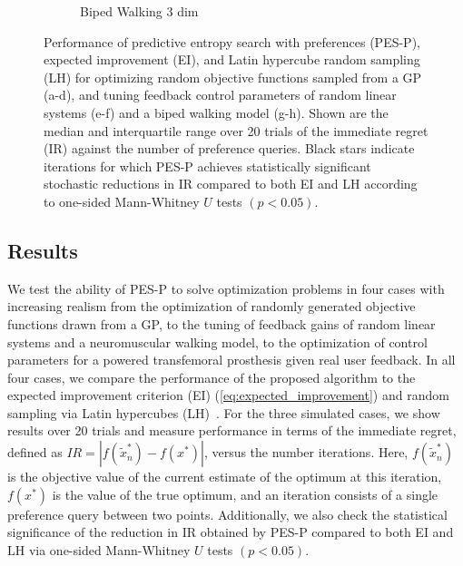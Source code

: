 \begin{figure*}[t!]
\begin{subfigure}[b]{0.24\textwidth}
        \vspace{-20pt}\caption{Biped Walking 3 dim}\label{fig:Neuro_3}
    \end{subfigure}
    \caption{Performance of predictive entropy search with preferences (PES-P),
    expected improvement (EI), and Latin hypercube random sampling (LH) for
    optimizing random objective functions sampled from a GP (a-d), and tuning
    feedback control parameters of random linear systems (e-f) and a biped
    walking model (g-h). Shown are the median and interquartile range over 20
    trials of the immediate regret (IR) against the number of preference
    queries. Black stars indicate iterations for which PES-P achieves
    statistically significant stochastic reductions in IR compared to both EI
    and LH according to one-sided Mann-Whitney $U$ tests $(p <
    0.05)$.}\label{fig:y_err_sim}
\end{figure*}

\subsection{Results}\label{s:results}
We test the ability of PES-P to solve optimization problems in four cases with
increasing realism from the optimization of randomly generated objective
functions drawn from a GP, to the tuning of feedback gains of random linear
systems and a neuromuscular walking model, to the optimization of control
parameters for a powered transfemoral prosthesis given real user feedback. In
all four cases, we compare the performance of the proposed algorithm to the
expected improvement criterion (EI) (\cref{eq:expected_improvement}) and random
sampling via Latin hypercubes (LH)~\citep{mckay2000comparison}. For the three simulated
cases, we show results over 20 trials and measure performance in terms of the
immediate regret, defined as $IR = |f(\tilde x_n^*) - f(x^*)|$, versus the
number iterations.  Here, $f(\tilde x_n^*)$ is the objective value of the
current estimate of the optimum at this iteration, $f(x^*)$ is the value of the
true optimum, and an iteration consists of a single preference query between two
points.  Additionally, we also check the statistical significance of the
reduction in IR obtained by PES-P compared to both EI and LH via one-sided
Mann-Whitney $U$ tests $(p < 0.05)$.

